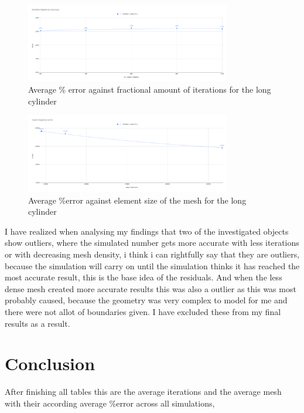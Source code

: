 \documentclass[12pt,a4paper]{article}
\begin{document}
\begin{figure}[H]
\centering
\includegraphics[width=0.8\textwidth]{image20.png}
\caption{Average \% error against fractional amount of iterations for the long cylinder}
\end{figure}

\begin{figure}[H]
\centering
\includegraphics[width=0.8\textwidth]{image12.png}
\caption{Average \%error against element size of the mesh for the long cylinder}
\end{figure}

I have realized when analysing my findings that two of the investigated objects show outliers, where the simulated number gets more accurate with less iterations or with decreasing mesh density, i think i can rightfully say that they are outliers, because the simulation will carry on until the simulation thinks it has reached the most accurate result, this is the base idea of the residuals. And when the less dense mesh created more accurate results this was also a outlier as this was most probably caused, because the geometry was very complex to model for me and there were not allot of boundaries given. I have excluded these from my final results as a result.

\section{Conclusion}

After finishing all tables this are the average iterations and the average mesh with their according average \%error across all simulations,
\end{document}

